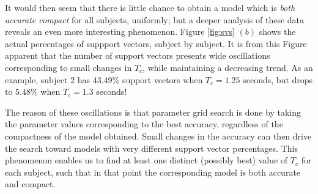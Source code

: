 \documentclass[a4paper,10pt,conference]{ieeeconf}
\begin{document}
It would then seem that there is little chance to obtain a model which
is \emph{both accurate compact} for all subjects, uniformly; but a
deeper analysis of these data reveals an even more interesting
phenomenon. Figure \ref{fig:svs} $(b)$ shows the actual percentages of
suppport vectors, subject by subject. It is from this Figure apparent
that the number of support vectors presents wide oscillations
corresponding to small changes in $T_c$, while maintaining a
decreasing trend. As an example, subject $2$ has $43.49\%$ support
vectors when $T_c=1.25$ seconds, but drops to $5.48\%$ when $T_c=1.3$
seconds!

The reason of these oscillations is that parameter grid search is done
by taking the parameter values corresponding to the best accuracy,
regardless of the compactness of the model obtained. Small changes in
the accuracy can then drive the search toward models with very
different support vector percentages. This phenomenon enables us to
find at least one distinct (possibly best) value of $T_c$ for each
subject, such that in that point the corresponding model is both
accurate and compact.
\end{document}
